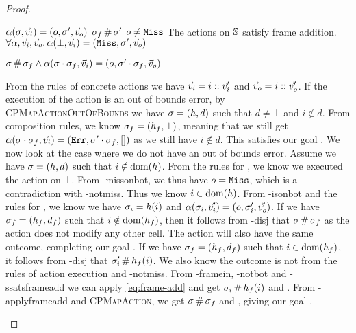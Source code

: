 \begin{proof}

\pfassume \begin{hypvlist}
 $\alpha(\sigma,\vec{v}_i)=(o,\sigma',\vec{v}_o)$
 $\sigma_f\operatorname{\#}\sigma'$
 $o\neq\texttt{Miss}$
 The actions on $\mathbb S$ satisfy frame addition.
{\color{red} $\forall \alpha, \vec{v}_i, \vec{v}_o\ldotp \alpha(\bot,\vec{v}_i)=(\texttt{Miss},\sigma',\vec{v}_o)$}
\end{hypvlist}
\pfprove \begin{goalvlist}
 $\sigma \operatorname{\#} \sigma_f \land \alpha(\sigma\cdot\sigma_f, \vec{v}_i)=(o, \sigma'\cdot\sigma_f, \vec{v}_o)$	
\end{goalvlist}

\pfcase{$\alpha\in\actions_\mmdl$}

\begin{hypvlist}
 From the rules of concrete actions we have $\vec{v}_i=i::\vec{v}_i'$ and $\vec{v}_o=i::\vec{v}_o'$.
 If the execution of the action is an out of bounds error, by \textsc{CPMapActionOutOfBounds} we have $\sigma=(h,d)$ such that $d\neq\bot$ and $i\notin d$.
 From composition rules, we know $\sigma_f=(h_f,\bot)$, meaning that we still get $\alpha(\sigma\cdot\sigma_f,\vec{v}_i)=(\texttt{Err},\sigma'\cdot\sigma_f,[])$ as we still have $i\notin d$. This satisfies our goal .
 We now look at the case where we do not have an out of bounds error. Assume we have $\sigma=(h,d)$ such that $i\notin \operatorname{dom}(h)$. From the rules for , we know we executed the action on $\bot$. {\color{red}From \hyp{missonbot}, we thus have $o=\texttt{Miss}$, which is a contradiction with \hyp{notmiss}. Thus we know $i\in \operatorname{dom}(h)$.}
 From \hyp{isonbot} and the rules for , we know we have $\sigma_i=h(i)$ and $\alpha(\sigma_i,\vec{v}_i')=(o,\sigma_i',\vec{v}_o')$.
 If we have $\sigma_f=(h_f,d_f)$ such that $i\notin \operatorname{dom}(h_f)$, then it follows from \hyp{disj} that $\sigma\operatorname{\#}\sigma_f$ as the action does not modify any other cell. The action will also have the same outcome, completing our goal .
 If we have $\sigma_f=(h_f,d_f)$ such that $i\in\operatorname{dom}(h_f)$, it follows from \hyp{disj} that $\sigma_i'\operatorname{\#} h_f(i)$. We also know the outcome is not \Miss{} from the rules of action execution and \hyp{notmiss}.
 From \hyp{framein}, \hyp{notbot} and \hyp{ssatsframeadd} we can apply \ref{eq:frame-add} and get $\sigma_i\operatorname{\#} h_f(i)$ and .
 From \hyp{applyframeadd} and \textsc{CPMapAction}, we get $\sigma\operatorname{\#}\sigma_f$ and , giving our goal .
\end{hypvlist}


\end{proof}
